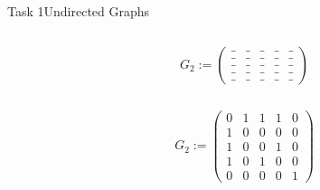 \begin{frame}[allowframebreaks]{Task 1}{Undirected Graphs}
  \begin{solutionnoinc}
    \begin{columns}
      \begin{column}{0.5\textwidth}
      \end{column}
      \begin{column}{0.5\textwidth} 
        \centering
        $G_2 :=
        \begin{pmatrix}
        \_ & \_ & \_ & \_ & \_ \\
        \_ & \_ & \_ & \_ & \_ \\
        \_ & \_ & \_ & \_ & \_ \\
        \_ & \_ & \_ & \_ & \_ \\
        \_ & \_ & \_ & \_ & \_
        \end{pmatrix}$
      \end{column}
    \end{columns}
  \end{solutionnoinc}
  \begin{solutionnoinc}
    \begin{columns}
      \begin{column}{0.5\textwidth}
      \end{column}
      \begin{column}{0.5\textwidth} 
        \centering
        $G_2 :=
        \begin{pmatrix}
        0 & 1 & 1 & 1 & 0 \\
        1 & 0 & 0 & 0 & 0 \\
        1 & 0 & 0 & 1 & 0 \\
        1 & 0 & 1 & 0 & 0 \\
        0 & 0 & 0 & 0 & 1
        \end{pmatrix}$
      \end{column}
    \end{columns}
  \end{solutionnoinc}
  \begin{solutionnoinc}
    \begin{columns}
      \begin{column}{0.4\textwidth}
      \end{column}
\end{columns}
\end{solutionnoinc}
\end{frame}
